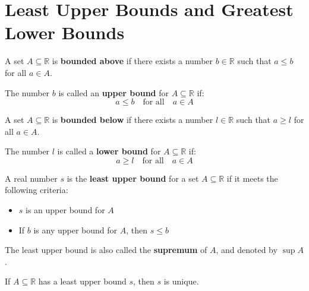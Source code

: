 \section{Least Upper Bounds and Greatest Lower Bounds}
\begin{definition} A set $A\subseteq\mathbb{R}$ is \textbf{bounded above} if there exists a number $b\in\mathbb{R}$ such that $a\leq b$ for all $a\in A$. 
\end{definition}
\par\vspace{0.3 cm}
\begin{definition} The number $b$ is called an \textbf{upper bound} for $A\subseteq\mathbb{R}$ if:
\[
a\leq b\quad\mbox{for all}\quad a\in A
\]
\end{definition}
\par\vspace{0.3 cm}
\begin{definition} A set $A\subseteq\mathbb{R}$ is \textbf{bounded below} if there exists a number $l\in\mathbb{R}$ such that $a\geq l$ for all $a\in A$. 
\end{definition}
\par\vspace{0.3 cm}
\begin{definition} The number $l$ is called a \textbf{lower bound} for $A\subseteq\mathbb{R}$ if:
\[
a\geq l\quad\mbox{for all}\quad a\in A
\]
\end{definition}
\par\vspace{0.3 cm}
\begin{definition} A real number $s$ is the \textbf{least upper bound} for a set $A\subseteq\mathbb{R}$ if it meets the following criteria:
\par\vspace{0.3 cm}
\begin{itemize}
\item $s$ is an upper bound for $A$
\item If $b$ is any upper bound for $A$, then $s\leq b$
\end{itemize}
\end{definition}
\par\vspace{0.3 cm}
The least upper bound is also called the \textbf{supremum} of $A$, and denoted by $\sup A$.
\par\vspace{0.3 cm}
\begin{theorem} If $A\subseteq\mathbb{R}$ has a least upper bound $s$, then $s$ is unique.
\end{theorem}
